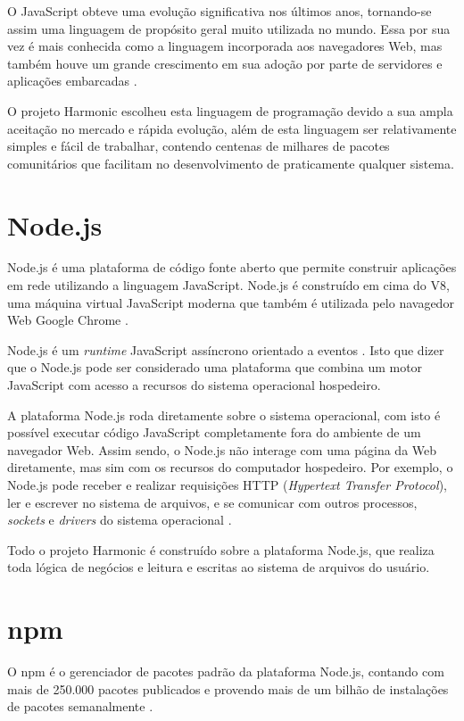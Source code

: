 \documentclass[ppginf, pep]{esinucpel}
\begin{document}
O JavaScript obteve uma evolução significativa nos últimos anos, tornando-se assim uma linguagem de propósito geral muito utilizada no mundo. Essa por sua vez é mais conhecida como a linguagem incorporada aos navegadores Web, mas também houve um grande crescimento em sua adoção por parte de servidores e aplicações embarcadas \cite{es2015}.

O projeto Harmonic escolheu esta linguagem de programação devido a sua ampla aceitação no mercado e rápida evolução, além de esta linguagem ser relativamente simples e fácil de trabalhar, contendo centenas de milhares de pacotes comunitários que facilitam no desenvolvimento de praticamente qualquer sistema.

\section{Node.js}

Node.js é uma plataforma de código fonte aberto que permite construir aplicações em rede utilizando a linguagem JavaScript. Node.js é construído em cima do V8, uma máquina virtual JavaScript moderna que também é utilizada pelo navagedor Web Google Chrome \cite{instant_nodejs_starter:03}.

Node.js é um \textit{runtime} JavaScript assíncrono orientado a eventos \cite{nodejs}. Isto que dizer que o Node.js pode ser considerado uma plataforma que combina um motor JavaScript com acesso a recursos do sistema operacional hospedeiro.

A plataforma Node.js roda diretamente sobre o sistema operacional, com isto é possível executar código JavaScript completamente fora do ambiente de um navegador Web. Assim sendo, o Node.js não interage com uma página da Web diretamente, mas sim com os recursos do computador hospedeiro. Por exemplo, o Node.js pode receber e realizar requisições HTTP (\textit{Hypertext Transfer Protocol}), ler e escrever no sistema de arquivos, e se comunicar com outros processos, \textit{sockets} e \textit{drivers} do sistema operacional \cite{javaworld}.

Todo o projeto Harmonic é construído sobre a plataforma Node.js, que realiza toda lógica de negócios e leitura e escritas ao sistema de arquivos do usuário.

\section{npm}

O npm é o gerenciador de pacotes padrão da plataforma Node.js, contando com mais de 250.000 pacotes publicados \cite{npm} e provendo mais de um bilhão de instalações de pacotes semanalmente \cite{npm_packages}.
\end{document}
